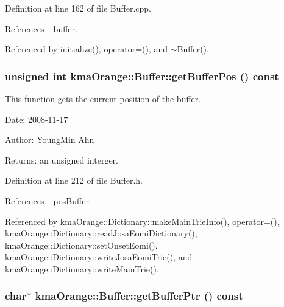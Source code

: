 Definition at line 162 of file Buffer.cpp.

References \_\-buffer.

Referenced by initialize(), operator=(), and $\sim$Buffer().\hypertarget{classkmaOrange_1_1Buffer_506499720e4e8cfdd18ac973d9ea9e71}{
\subsubsection[{getBufferPos}]{\setlength{\rightskip}{0pt plus 5cm}unsigned int kmaOrange::Buffer::getBufferPos () const}}
\label{classkmaOrange_1_1Buffer_506499720e4e8cfdd18ac973d9ea9e71}


This function gets the current position of the buffer. 

\begin{Desc}
\item[Date:]2008-11-17 \end{Desc}
\begin{Desc}
\item[Author:]YoungMin Ahn \end{Desc}
\begin{Desc}
\item[Returns:]an unsigned interger. \end{Desc}


Definition at line 212 of file Buffer.h.

References \_\-posBuffer.

Referenced by kmaOrange::Dictionary::makeMainTrieInfo(), operator=(), kmaOrange::Dictionary::readJosaEomiDictionary(), kmaOrange::Dictionary::setOnsetEomi(), kmaOrange::Dictionary::writeJosaEomiTrie(), and kmaOrange::Dictionary::writeMainTrie().\hypertarget{classkmaOrange_1_1Buffer_05b1cadf0bc0a1ec4c5bb03fc02654bf}{
\subsubsection[{getBufferPtr}]{\setlength{\rightskip}{0pt plus 5cm}char$\ast$ kmaOrange::Buffer::getBufferPtr () const}}
\label{classkmaOrange_1_1Buffer_05b1cadf0bc0a1ec4c5bb03fc02654bf}


